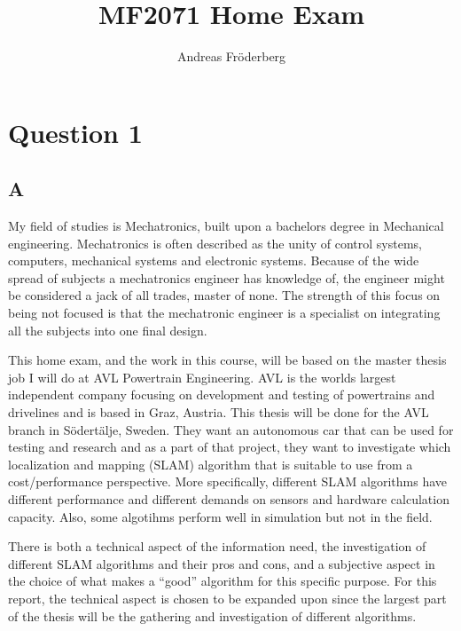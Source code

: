 \documentclass[a4paper, 12pt]{article}
\begin{document}
\title{MF2071 Home Exam}
\author{Andreas Fr\"{o}derberg}
\maketitle
\section*{Question 1}
\subsection*{A}
My field of studies is Mechatronics, built upon a bachelors degree in Mechanical
engineering. Mechatronics is often described as the unity of control systems,
computers, mechanical systems and electronic systems. Because of the wide spread
of subjects a mechatronics engineer has knowledge of, the engineer might be 
considered a jack of all trades, master of none. The strength of this focus on 
being not focused is that the mechatronic engineer is a specialist on integrating
all the subjects into one final design. 

This home exam, and the work in this course, will be based on the master thesis
job I will do at AVL Powertrain Engineering. AVL is the worlds largest independent
company focusing on development and testing of powertrains and drivelines and is
based in Graz, Austria. This thesis will be done for the AVL branch in 
S\"{o}dert\"{a}lje, Sweden. They want an autonomous car that can be used for
testing and research and as a part of that project, they want to investigate
which localization and mapping (SLAM) algorithm that is suitable to use 
from a cost/performance perspective. More specifically, different SLAM algorithms
have different performance and different demands on sensors and hardware 
calculation capacity. Also, some algotihms perform well in simulation but not in the 
field. 

There is both a technical aspect of the information need, the investigation of
different SLAM algorithms and their pros and cons, and a subjective aspect in 
the choice of what makes a ``good'' algorithm for this specific purpose. For this 
report, the technical aspect is chosen to be expanded upon since the largest part 
of the thesis will be the gathering and investigation of different algorithms.
\end{document}
